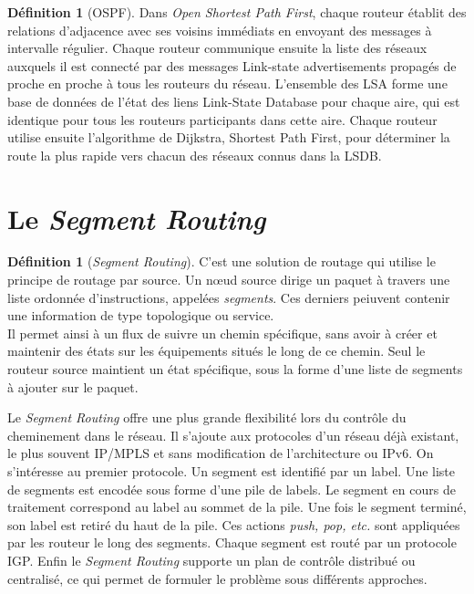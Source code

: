 \documentclass[12pt]{book}
\theoremstyle{definition}
\newtheorem{definition}[lemma]{Définition}
\theoremstyle{remark}
\begin{document}
       \begin{definition}[OSPF]
               Dans \emph{Open Shortest Path First}, chaque routeur établit des relations d'adjacence avec ses voisins immédiats en envoyant des messages à intervalle régulier. Chaque routeur communique ensuite la liste des réseaux auxquels il est connecté par des messages Link-state advertisements propagés de proche en proche à tous les routeurs du réseau. L'ensemble des LSA forme une base de données de l'état des liens Link-State Database pour chaque aire, qui est identique pour tous les routeurs participants dans cette aire. Chaque routeur utilise ensuite l'algorithme de Dijkstra, Shortest Path First, pour déterminer la route la plus rapide vers chacun des réseaux connus dans la LSDB.
       \end{definition}

       \section{Le \emph{Segment Routing}}

       \begin{definition}[\emph{Segment Routing}]
               C'est une solution de routage qui utilise le principe de routage par source. Un nœud source dirige un paquet à travers une liste ordonnée d’instructions, appelées \emph{segments}. Ces derniers peiuvent contenir une information de type topologique ou service. \\
               Il permet ainsi à un flux de suivre un chemin spécifique, sans avoir à créer et maintenir des états sur les équipements situés le long de ce chemin. Seul le routeur source maintient un état spécifique, sous la forme d’une liste de segments à ajouter sur le paquet.
       \end{definition}

       Le \emph{Segment Routing} offre une plus grande flexibilité lors du contrôle du cheminement dans le réseau. Il s'ajoute aux protocoles d'un réseau déjà existant, le plus souvent IP/MPLS et sans modification de l'architecture ou IPv6. On s'intéresse au premier protocole.
       Un segment est identifié par un label. Une liste de segments est encodée sous forme d’une pile de labels. Le segment en cours de traitement correspond au label au sommet de la pile. Une fois le segment terminé, son label est retiré du haut de la pile. Ces actions \emph{push, pop, etc.} sont appliquées par les routeur le long des segments. Chaque segment est routé par un protocole IGP.
       Enfin le \emph{Segment Routing} supporte un plan de contrôle distribué ou centralisé, ce qui permet de formuler le problème sous différents approches.
\end{document}
